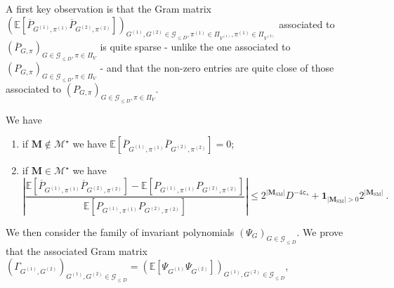 \documentclass[final]{colt2026}
\newcommand{\1}{\mathbf{1}}
\begin{document}
A first key observation is that the Gram matrix $\left(\mathbb E\left[\overline{P}_{G^{(1)},\pi^{(1)}}\overline{P}_{G^{(2)},\pi^{(2)}}\right]\right)_{G^{(1)}, G^{(2)}\in \mathcal G_{\leq D}, \pi^{(1)} \in \Pi_{V^{(1)}}, \pi^{(1)} \in \Pi_{V^{(2)}}}$ associated to $(\overline{P}_{G,\pi})_{G\in \mathcal G_{\leq D}, \pi \in \Pi_V}$ is quite sparse - unlike the one associated to $(P_{G,\pi})_{G\in \mathcal G_{\leq D}, \pi \in \Pi_V}$ - and that  the non-zero entries are quite close of those associated to $(P_{G,\pi})_{G\in \mathcal G_{\leq D}, \pi \in \Pi_V}$. 
\begin{proposition} \label{prop:boundbar}
     We have 
    \begin{enumerate}
    \item if $\mathbf{M}\notin\mathcal{M}^{\star}$ we have $\mathbb{E}\left[\overline{P}_{G^{(1)}, \pi^{(1)}}\overline{P}_{G^{(2)}, \pi^{(2)}}\right] = 0$; 
    \item if $\mathbf{M}\in \mathcal{M}^\star$ we have
    \begin{equation*}
        \left|\dfrac{\mathbb{E}\left[\overline{P}_{G^{(1)}, \pi^{(1)}}\overline{P}_{G^{(2)}, \pi^{(2)}}\right] - \mathbb{E}\left[P_{G^{(1)}, \pi^{(1)}}P_{G^{(2)}, \pi^{(2)}}\right]}{\mathbb{E}\left[P_{G^{(1)}, \pi^{(1)}}P_{G^{(2)}, \pi^{(2)}}\right]}\right| \leq 
        2^{|\mathbf M_{\mathrm{SM}}|}D^{-4\texttt{c}_s} + \mathbf{1}_{|\mathbf M_{\mathrm{SM}}|>0} 2^{|\mathbf M_{\mathrm{SM}}|}\ . 
    \end{equation*}
    \end{enumerate} 
\end{proposition}
We then consider the family of invariant polynomials $(\Psi_G)_{G\in \mathcal G_{\leq D}}$. We prove that the associated Gram matrix  $\left(\Gamma_{G^{(1)}, G^{(2)}}\right)_{G^{(1)}, G^{(2)}\in \mathcal G_{\leq D}} = \left(\mathbb E\left[\Psi_{G^{(1)}}\Psi_{G^{(2)}}\right]\right)_{G^{(1)}, G^{(2)}\in \mathcal G_{\leq D}}$,
\end{document}
